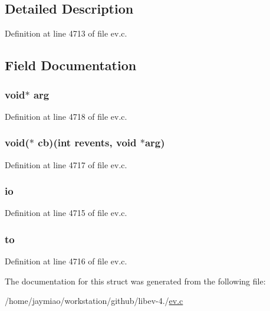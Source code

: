 \subsection{\-Detailed \-Description}


\-Definition at line 4713 of file ev.\-c.



\subsection{\-Field \-Documentation}
\hypertarget{structev__once_a9ce2ec4812a92cb6ab39f6e81e9173a9}{
\subsubsection[{arg}]{\setlength{\rightskip}{0pt plus 5cm}void$\ast$ {\bf arg}}}\label{structev__once_a9ce2ec4812a92cb6ab39f6e81e9173a9}


\-Definition at line 4718 of file ev.\-c.

\hypertarget{structev__once_ade289570a63e50d9a874027c1f34f0ff}{
\subsubsection[{cb}]{\setlength{\rightskip}{0pt plus 5cm}void($\ast$ {\bf cb})(int revents, void $\ast${\bf arg})}}\label{structev__once_ade289570a63e50d9a874027c1f34f0ff}


\-Definition at line 4717 of file ev.\-c.

\hypertarget{structev__once_a0a60f96152fbb4f3d01c7ef3e4a3d856}{
\subsubsection[{io}]{ {\bf io}}}\label{structev__once_a0a60f96152fbb4f3d01c7ef3e4a3d856}


\-Definition at line 4715 of file ev.\-c.

\hypertarget{structev__once_a07c6e8b8c00f07a7dcad174eb9b0a9e8}{
\subsubsection[{to}]{ {\bf to}}}\label{structev__once_a07c6e8b8c00f07a7dcad174eb9b0a9e8}


\-Definition at line 4716 of file ev.\-c.



\-The documentation for this struct was generated from the following file\-:\begin{DoxyCompactItemize}
\item 
/home/jaymiao/workstation/github/libev-\/4./\hyperlink{ev_8c}{ev.\-c}\end{DoxyCompactItemize}
